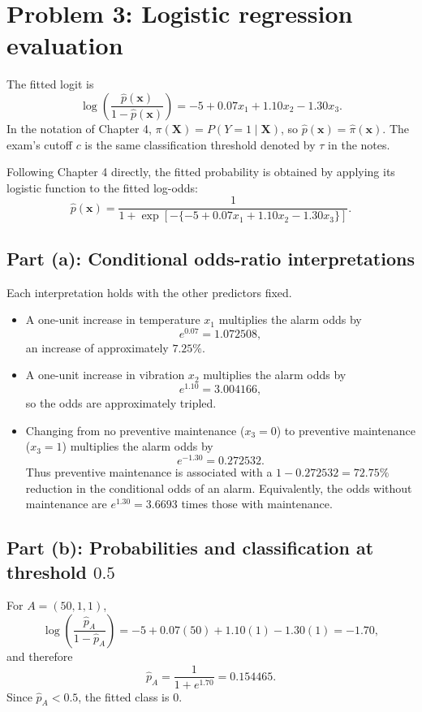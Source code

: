 \documentclass[11pt]{article}
\newcommand{\answer}[1]{\boxed{\displaystyle #1}}
\begin{document}
\clearpage
\section{Problem 3: Logistic regression evaluation}

The fitted logit is
\[
\log\left(\frac{\hat p(\bm x)}{1-\hat p(\bm x)}\right)
=-5+0.07x_1+1.10x_2-1.30x_3.
\]
In the notation of Chapter 4,
\(\pi(\bm X)=P(Y=1\mid\bm X)\), so
\(\hat p(\bm x)=\hat\pi(\bm x)\). The exam's cutoff \(c\) is the same
classification threshold denoted by \(\tau\) in the notes.

Following Chapter 4 directly, the fitted probability is obtained by applying
its logistic function to the fitted log-odds:
\[
\hat p(\bm x)
=\frac{1}{1+\exp\!\left[-\{-5+0.07x_1+1.10x_2-1.30x_3\}\right]}.
\]

\subsection{Part (a): Conditional odds-ratio interpretations}

Each interpretation holds with the other predictors fixed.
\begin{itemize}
\item A one-unit increase in temperature \(x_1\) multiplies the alarm odds by
\[
e^{0.07}=\answer{1.072508},
\]
an increase of approximately \(7.25\%\).
\item A one-unit increase in vibration \(x_2\) multiplies the alarm odds by
\[
e^{1.10}=\answer{3.004166},
\]
so the odds are approximately tripled.
\item Changing from no preventive maintenance (\(x_3=0\)) to preventive
maintenance (\(x_3=1\)) multiplies the alarm odds by
\[
e^{-1.30}=\answer{0.272532}.
\]
Thus preventive maintenance is associated with a \(1-0.272532=72.75\%\)
reduction in the conditional odds of an alarm. Equivalently, the odds without
maintenance are \(e^{1.30}=3.6693\) times those with maintenance.
\end{itemize}

\subsection{Part (b): Probabilities and classification at threshold \(0.5\)}

For \(A=(50,1,1)\),
\[
\log\left(\frac{\hat p_A}{1-\hat p_A}\right)
=-5+0.07(50)+1.10(1)-1.30(1)=-1.70,
\]
and therefore
\[
\hat p_A=\frac1{1+e^{1.70}}=\answer{0.154465}.
\]
Since \(\hat p_A<0.5\), the fitted class is \(\answer{0}\).
\end{document}
